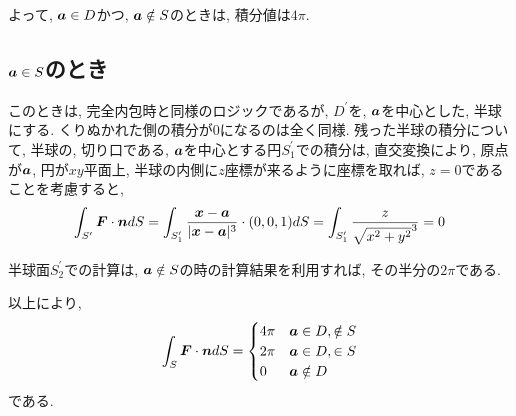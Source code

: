\documentclass{jsarticle}
\newcommand*{\mbold}[1]{\mbox{\boldmath $#1$}}
\begin{document}
よって, $\mbold{a} \in D$かつ, $\mbold{a} \notin S$のときは, 積分値は$4\pi$.

\subsection{$\mbold{a} \in S$のとき}
このときは, 完全内包時と同様のロジックであるが, $D^\prime$を, $\mbold{a}$を中心とした, 半球にする. 
くりぬかれた側の積分が$0$になるのは全く同様. 
残った半球の積分について, 
半球の, 切り口である, $\mbold{a}$を中心とする円$S^\prime_1$での積分は, 
直交変換により, 原点が$\mbold{a}$, 円が$xy$平面上, 半球の内側に$z$座標が来るように座標を取れば, 
$z = 0$であることを考慮すると, 
\begin{equation}
  \int_{S^\prime} \mbold{F}\cdot \mbold{n}dS
  = \int_{S^\prime_1} \frac{\mbold{x} - \mbold{a}}{|\mbold{x} - \mbold{a}|^3} \cdot (0, 0, 1)dS 
  = \int_{S^\prime_1} \frac{z}{\sqrt{x^2 + y^2}^3} = 0
\end{equation}

半球面$S^\prime_2$での計算は, $\mbold{a} \notin S$の時の計算結果を利用すれば, その半分の$2\pi$である. 

以上により, 
\begin{equation}
  \int_S \mbold{F}\cdot\mbold{n}dS = 
  \begin{cases}
    4\pi & \mbold{a} \in D, \notin S \\
    2\pi & \mbold{a} \in D, \in S \\
    0    & \mbold{a} \notin D 
  \end{cases}
\end{equation}
である. 
\end{document}
